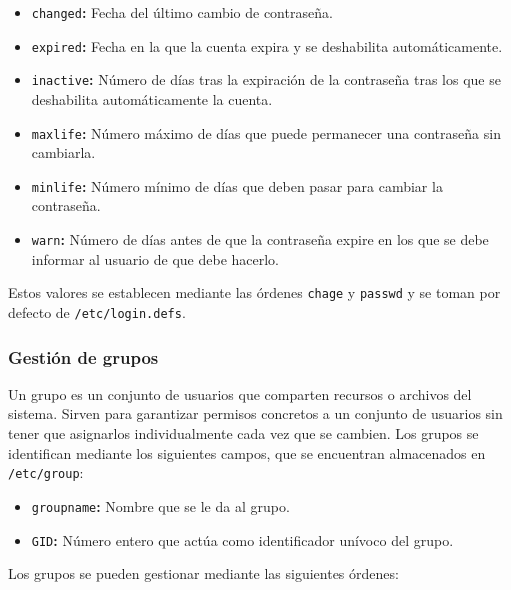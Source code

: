 \begin{itemize}
	\item\texttt{changed}\textbf{:} Fecha del último cambio de contraseña.
	\item\texttt{expired}\textbf{:} Fecha en la que la cuenta expira y se deshabilita automáticamente.
	\item\texttt{inactive}\textbf{:} Número de días tras la expiración de la contraseña tras los que se deshabilita automáticamente la cuenta.
	\item\texttt{maxlife}\textbf{:} Número máximo de días que puede permanecer una contraseña sin cambiarla.
	\item\texttt{minlife}\textbf{:} Número mínimo de días que deben pasar para cambiar la contraseña.
	\item\texttt{warn}\textbf{:} Número de días antes de que la contraseña expire en los que se debe informar al usuario de que debe hacerlo.
\end{itemize}

Estos valores se establecen mediante las órdenes \texttt{chage} y \texttt{passwd} y se toman por defecto de \texttt{/etc/login.defs}.

\subsubsection{Gestión de grupos}

Un grupo es un conjunto de usuarios que comparten recursos o archivos del sistema.
Sirven para garantizar permisos concretos a un conjunto de usuarios sin tener que asignarlos individualmente cada vez que se cambien.
Los grupos se identifican mediante los siguientes campos, que se encuentran almacenados en \texttt{/etc/group}:

\begin{itemize}
	\item\texttt{groupname}\textbf{:} Nombre que se le da al grupo.
	\item\texttt{GID}\textbf{:} Número entero que actúa como identificador unívoco del grupo.
\end{itemize}

Los grupos se pueden gestionar mediante las siguientes órdenes:

